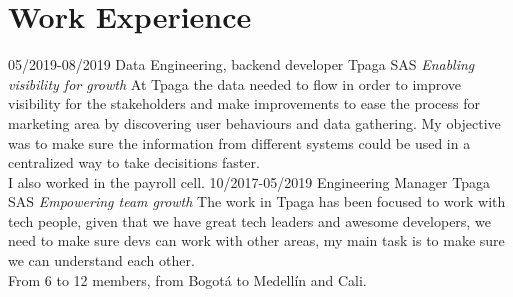 \section{Work Experience}

\begin{entrylist}
  \entry
    {05/2019-08/2019}
    {Data Engineering, backend developer}
    {Tpaga SAS {\sl Enabling visibility for growth}}
    {At Tpaga the data needed to flow in order to improve visibility for the
    stakeholders and make improvements to ease the process for marketing area
    by discovering user behaviours and data gathering.  My objective was to
    make sure the information from different systems could be used in a centralized
    way to take decisitions faster.\\I also worked in the payroll cell.}
  \entry
    {10/2017-05/2019}
    {Engineering Manager}
    {Tpaga SAS {\sl Empowering team growth}}
    {The work in Tpaga has been focused to work with tech people, given
    that we have great tech leaders and awesome developers, we need to
    make sure devs can work with other areas, my main task is to make
    sure we can understand each other.\\From 6 to 12 members, from Bogotá to Medellín and Cali. }

  \end{entrylist}
  
  \newpage
  

